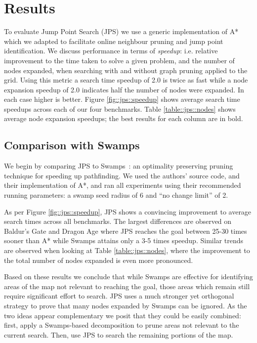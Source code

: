 \section{Results}
\label{cha::jps::results}

To evaluate Jump Point Search (JPS) we use a generic implementation of A{*}
which we adapted to facilitate online neighbour pruning and jump point
identification.  We discuss performance in terms of \emph{speedup}: i.e.
relative improvement to the time taken to solve a given problem, and the
number of nodes expanded, when searching with and without graph pruning
applied to the grid.  Using this metric a search time speedup of 2.0 is twice
as fast while a node expansion speedup of 2.0 indicates half the number of
nodes were expanded.  In each case higher is better.  Figure
\ref{fig::jps::speedup} shows average search time speedups across each of our
four benchmarks. Table \ref{table::jps::nodes} shows average node expansion
speedups; the best results for each column are in bold.



\subsection{Comparison with Swamps}
We begin by comparing JPS to Swamps~\citep{pochter10}: an optimality preserving
pruning technique for speeding up pathfinding.  We used the authors' source
code, and their implementation of A{*}, and ran all experiments using their
recommended running parameters: a swamp seed radius of 6 and ``no change
limit'' of 2.

As per Figure \ref{fig::jps::speedup}, JPS shows a convincing improvement to
average search times across all benchmarks.  The largest differences are
observed on Baldur's Gate and Dragon Age where JPS reaches the goal between
25-30 times sooner than A{*} while Swamps attains only a 3-5 times speedup.
Similar trends are observed when looking at Table \ref{table::jps::nodes},
where the improvement to the total number of nodes expanded is even more
pronounced.

Based on these results we conclude that while Swamps are effective for
identifying areas of the map not relevant to reaching the goal, those areas
which remain still require significant effort to search.  JPS uses a much
stronger yet orthogonal strategy to prove that many nodes expanded by Swamps
can be ignored.  As the two ideas appear complementary we posit that they
could be easily combined: first, apply a Swamps-based decomposition to prune
areas not relevant to the current search.  Then, use JPS to search the
remaining portions of the map.

